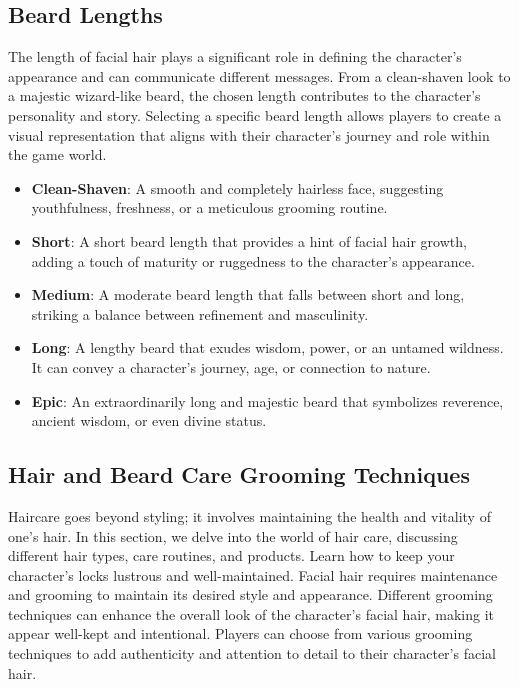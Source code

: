 \documentclass[12pt]{book}
\begin{document}
\subsection{\textbf{Beard Lengths}}

The length of facial hair plays a significant role in defining the character's appearance and can communicate different messages. From a clean-shaven look to a majestic wizard-like beard, the chosen length contributes to the character's personality and story. Selecting a specific beard length allows players to create a visual representation that aligns with their character's journey and role within the game world.

\begin{itemize}
    \item \textbf{Clean-Shaven}: A smooth and completely hairless face, suggesting youthfulness, freshness, or a meticulous grooming routine.
    \item \textbf{Short}: A short beard length that provides a hint of facial hair growth, adding a touch of maturity or ruggedness to the character's appearance.
    \item \textbf{Medium}: A moderate beard length that falls between short and long, striking a balance between refinement and masculinity.
    \item \textbf{Long}: A lengthy beard that exudes wisdom, power, or an untamed wildness. It can convey a character's journey, age, or connection to nature.
    \item \textbf{Epic}: An extraordinarily long and majestic beard that symbolizes reverence, ancient wisdom, or even divine status.
\end{itemize}

\subsection{\textbf{Hair and Beard Care Grooming Techniques}}

Haircare goes beyond styling; it involves maintaining the health and vitality of one's hair. In this section, we delve into the world of hair care, discussing different hair types, care routines, and products. Learn how to keep your character's locks lustrous and well-maintained. Facial hair requires maintenance and grooming to maintain its desired style and appearance. Different grooming techniques can enhance the overall look of the character's facial hair, making it appear well-kept and intentional. Players can choose from various grooming techniques to add authenticity and attention to detail to their character's facial hair.
\end{document}
